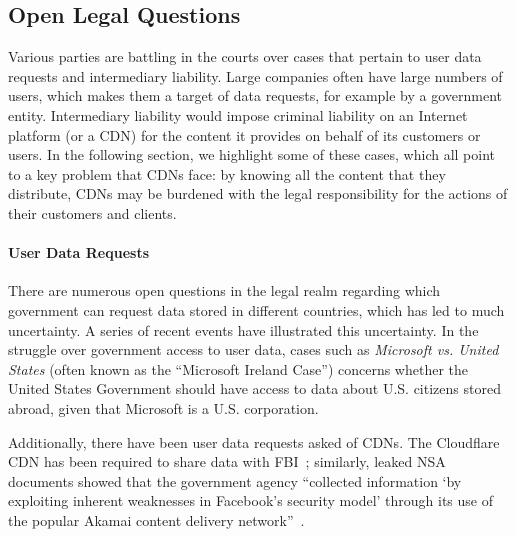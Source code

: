 \subsection{Open Legal Questions}

Various parties are battling in the courts over cases that pertain to user data
requests and intermediary liability.  Large companies
often have large numbers of users, which makes them a target of data requests, for example by a government entity.  Intermediary 
liability would impose criminal liability on an Internet platform (or a CDN) for
the content it provides on behalf of its customers or users.
In the following section, we highlight some of these cases, which all point to a key problem that CDNs face: by knowing all the content 
that they distribute, CDNs may be burdened with the legal responsibility for the
actions of their customers and clients.

\paragraph{User Data Requests}
There are numerous open questions in the legal realm regarding which government can request data stored in different countries, which 
has led to much uncertainty.  A series of recent events have illustrated this uncertainty.  In the struggle over government access to 
user data, cases such as {\it Microsoft vs. United States} (often known as the ``Microsoft Ireland Case'') concerns whether the United 
States Government should have access to data about U.S. citizens stored abroad, given that Microsoft is a U.S. corporation.  

Additionally, there have been user data requests asked of CDNs.  The Cloudflare CDN has been required
to share data with FBI~\cite{cloudflare_nsl}; similarly, leaked NSA documents showed
that the government agency ``collected information `by exploiting inherent 
weaknesses in Facebook's security model' through its use of the popular Akamai content
delivery network''~\cite{facebook_surv}.

